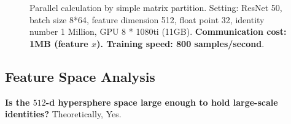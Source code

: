 \documentclass[10pt,twocolumn,letterpaper]{article}
\begin{document}
\begin{figure}[h!]
\small
\centering
{}
\caption{Parallel calculation by simple matrix partition. Setting: ResNet 50, batch size 8*64, feature dimension 512, float point 32, identity number 1 Million, GPU 8 * 1080ti (11GB). {\bf Communication cost: 1MB (feature $x$). Training speed: 800 samples/second}.}
\label{fig:parallelillus}
\vspace{-10pt}
\end{figure}

\subsection{Feature Space Analysis}

{\bf Is the $512$-d hypersphere space large enough to hold large-scale identities?} Theoretically, Yes. 
\end{document}

